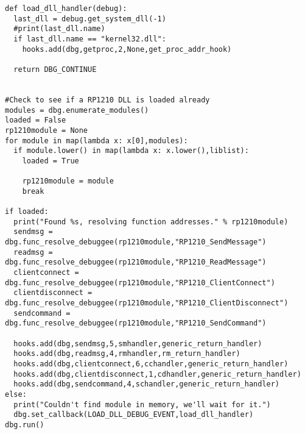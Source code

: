 \begin{verbatim}
def load_dll_handler(debug):
  last_dll = debug.get_system_dll(-1)
  #print(last_dll.name)
  if last_dll.name == "kernel32.dll":
    hooks.add(dbg,getproc,2,None,get_proc_addr_hook)

  return DBG_CONTINUE


#Check to see if a RP1210 DLL is loaded already
modules = dbg.enumerate_modules()
loaded = False
rp1210module = None
for module in map(lambda x: x[0],modules):
  if module.lower() in map(lambda x: x.lower(),liblist):
    loaded = True

    rp1210module = module
    break

if loaded:
  print("Found %s, resolving function addresses." % rp1210module)
  sendmsg = dbg.func_resolve_debuggee(rp1210module,"RP1210_SendMessage")
  readmsg = dbg.func_resolve_debuggee(rp1210module,"RP1210_ReadMessage")
  clientconnect = dbg.func_resolve_debuggee(rp1210module,"RP1210_ClientConnect")
  clientdisconnect = dbg.func_resolve_debuggee(rp1210module,"RP1210_ClientDisconnect")
  sendcommand = dbg.func_resolve_debuggee(rp1210module,"RP1210_SendCommand")

  hooks.add(dbg,sendmsg,5,smhandler,generic_return_handler)
  hooks.add(dbg,readmsg,4,rmhandler,rm_return_handler)
  hooks.add(dbg,clientconnect,6,cchandler,generic_return_handler)
  hooks.add(dbg,clientdisconnect,1,cdhandler,generic_return_handler)
  hooks.add(dbg,sendcommand,4,schandler,generic_return_handler)
else:
  print("Couldn't find module in memory, we'll wait for it.")
  dbg.set_callback(LOAD_DLL_DEBUG_EVENT,load_dll_handler)
dbg.run()





\end{verbatim}

